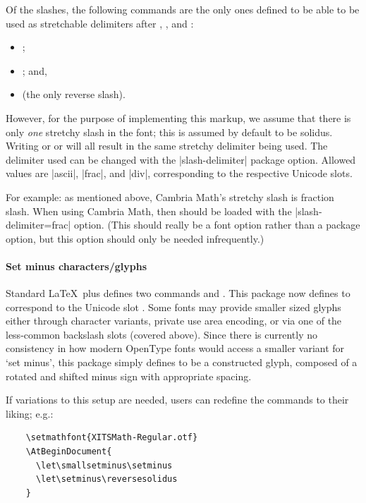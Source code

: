 Of the slashes, the following commands are the only ones defined to be able to be used as stretchable delimiters after
, , and :
\begin{itemize}
\item {};
\item {}; and,
\item {} (the only reverse slash).
\end{itemize}

However, for the purpose of implementing this markup, we assume that there is only \emph{one} stretchy slash
in the font; this is assumed by default to be  {solidus}.
Writing  or  or 
will all result in the same stretchy delimiter being used.
The delimiter used can be changed with the |slash-delimiter| package option.
Allowed values are |ascii|, |frac|, and |div|, corresponding to the respective
Unicode slots.

For example: as mentioned above, Cambria Math's stretchy slash is
 {fraction slash}. When using Cambria Math, then
 should be loaded with the |slash-delimiter=frac| option.
(This should really be a font option rather than a package option, but this option should only be needed infrequently.)

\paragraph{Set minus characters/glyphs}

Standard \LaTeX\ plus  defines two commands  and .
This package now defines  to correspond to the Unicode slot .
Some fonts may provide smaller sized glyphs either through character variants, private use area encoding, or via one of the less-common backslash slots (covered above).
Since there is currently no consistency in how modern OpenType fonts would access a smaller variant for `set minus', this package simply defines  to be a constructed glyph, composed of a rotated and shifted minus sign with appropriate  spacing.

If variations to this setup are needed, users can redefine the commands to their liking; e.g.:
\begin{verbatim}
    \setmathfont{XITSMath-Regular.otf}
    \AtBeginDocument{
      \let\smallsetminus\setminus
      \let\setminus\reversesolidus
    }
\end{verbatim}


